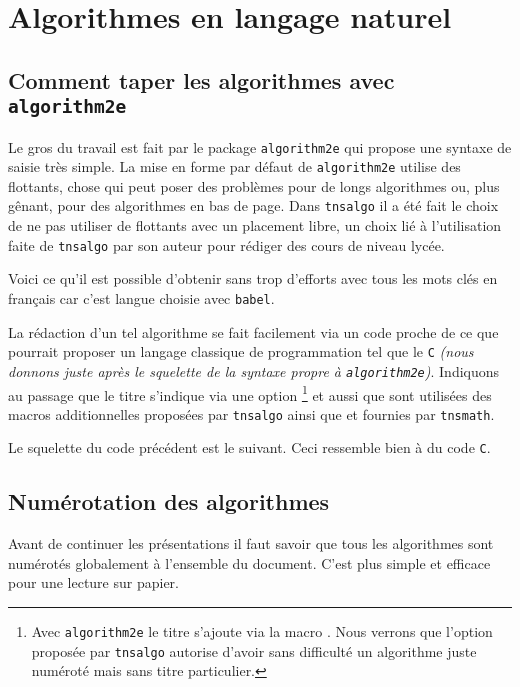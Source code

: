 \documentclass[12pt,a4paper]{article}
\begin{document}
\newpage

\section{Algorithmes en langage naturel}

\subsection{Comment taper les algorithmes avec \texttt{algorithm2e}}

Le gros du travail est fait par le package \verb#algorithm2e# qui propose une syntaxe de saisie très simple.
La mise en forme par défaut de \verb#algorithm2e# utilise des flottants, chose qui peut poser des problèmes pour de longs algorithmes ou, plus gênant, pour des algorithmes en bas de page.
Dans \verb#tnsalgo# il a été fait le choix de ne pas utiliser de flottants avec un placement libre, un choix lié à l'utilisation faite de \verb#tnsalgo# par son auteur pour rédiger des cours de niveau lycée. 


\medskip


Voici ce qu'il est possible d'obtenir sans trop d'efforts avec tous les mots clés en français car c'est langue choisie avec \verb#babel#.


\bigskip

\bigskip


La rédaction d'un tel algorithme se fait facilement via un code proche de ce que pourrait proposer un langage classique de programmation tel que le \Verb#C# \emph{(nous donnons juste après le squelette de la syntaxe propre à \texttt{algorithm2e})}.
Indiquons au passage que le titre s'indique via une option
\footnote{
	Avec \texttt{algorithm2e} le titre s'ajoute via la macro .
	Nous verrons que l'option proposée par \texttt{tnsalgo} autorise d'avoir sans difficulté un algorithme juste numéroté mais sans titre particulier.
}
et aussi que sont utilisées des macros additionnelles proposées par \verb#tnsalgo# ainsi que  et  fournies par \verb#tnsmath#.




Le squelette du code précédent est le suivant. Ceci ressemble bien à du code \verb#C#. 


\begin{latexex-alone}

\end{latexex-alone}




\subsection{Numérotation des algorithmes}

Avant de continuer les présentations il faut savoir que tous les algorithmes sont numérotés globalement à l'ensemble du document. C'est plus simple et efficace pour une lecture sur papier.
\end{document}
